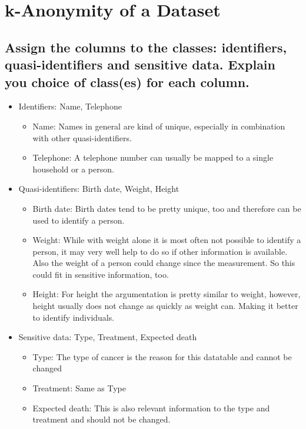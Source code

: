 \section{k-Anonymity of a Dataset}

\subsection{Assign the columns to the classes: identifiers, quasi-identifiers and sensitive data. Explain you choice of class(es) for each column.}

\begin{itemize}
	\item Identifiers: Name, Telephone
	\begin{itemize}
		\item Name: Names in general are kind of unique, especially in combination with other quasi-identifiers.
		\item Telephone: A telephone number can usually be mapped to a single household or a person.
	\end{itemize}
	\item Quasi-identifiers: Birth date, Weight, Height
	\begin{itemize}
		\item Birth date: Birth dates tend to be pretty unique, too and therefore can be used to identify a person.
		\item Weight: While with weight alone it is most often not possible to identify a person, it may very well help to do so if other information is available. Also the weight of a person could change since the measurement. So this could fit in sensitive information, too.
		\item Height: For height the argumentation is pretty similar to weight, however, height usually does not change as quickly as weight can. Making it better to identify individuals.
	\end{itemize}
	\item Sensitive data: Type, Treatment, Expected death
	\begin{itemize}
		\item Type: The type of cancer is the reason for this datatable and cannot be changed
		\item Treatment: Same as Type
		\item Expected death: This is also relevant information to the type and treatment and should not be changed.
	\end{itemize}
\end{itemize}

